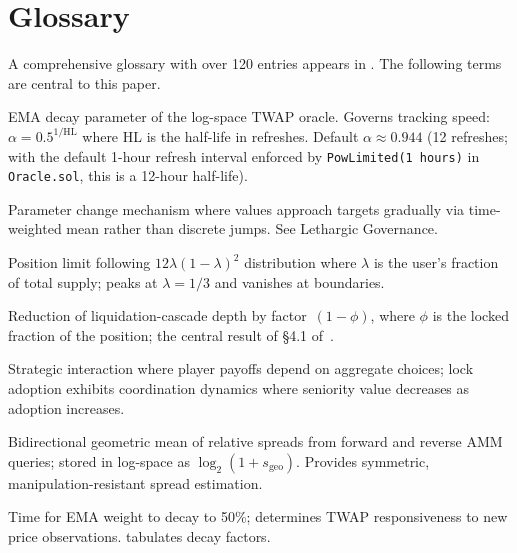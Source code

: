 \documentclass[10pt,a4paper,twocolumn]{article}
\begin{document}
\section*{Glossary}
\label{mtp:glossary}

\noindent A comprehensive glossary with over 120 entries appears in \cite{ref}. The following terms are central to this paper.

\begin{description}[style=nextline, font=\normalfont\bfseries, leftmargin=1.5em]

\item[$\alpha$\,$\dagger$] EMA decay parameter of the log-space TWAP oracle. Governs tracking speed: $\alpha = 0.5^{1/\text{HL}}$ where HL is the half-life in refreshes. Default $\alpha \approx 0.944$ (12 refreshes; with the default 1-hour refresh interval enforced by \texttt{PowLimited(1 hours)} in \texttt{Oracle.sol}, this is a 12-hour half-life).

\item[Asymptotic Transition] Parameter change mechanism where values approach targets gradually via time-weighted mean rather than discrete jumps. See Lethargic Governance.

\item[Beta Cap] Position limit following \mbox{$12\lambda(1-\lambda)^2$} distribution where $\lambda$ is the user's fraction of total supply; peaks at $\lambda = 1/3$ and vanishes at boundaries.

\item[Cascade Attenuation] Reduction of liquidation-cascade depth by factor~$(1{-}\phi)$, where $\phi$ is the locked fraction of the position; the central result of \S4.1 of~\cite{wp}.

\item[Coordination Game] Strategic interaction where player payoffs depend on aggregate choices; lock adoption exhibits coordination dynamics where seniority value decreases as adoption increases.

\item[Geomean Spread] Bidirectional geometric mean of relative spreads from forward and reverse AMM queries; stored in log-space as $\log_2(1 + s_{\text{geo}})$. Provides symmetric, manipulation-resistant spread estimation.

\item[Half-Life] Time for EMA weight to decay to 50\%; determines TWAP responsiveness to new price observations. \cite[\S C]{wp} tabulates decay factors.


\end{description}
\end{document}
